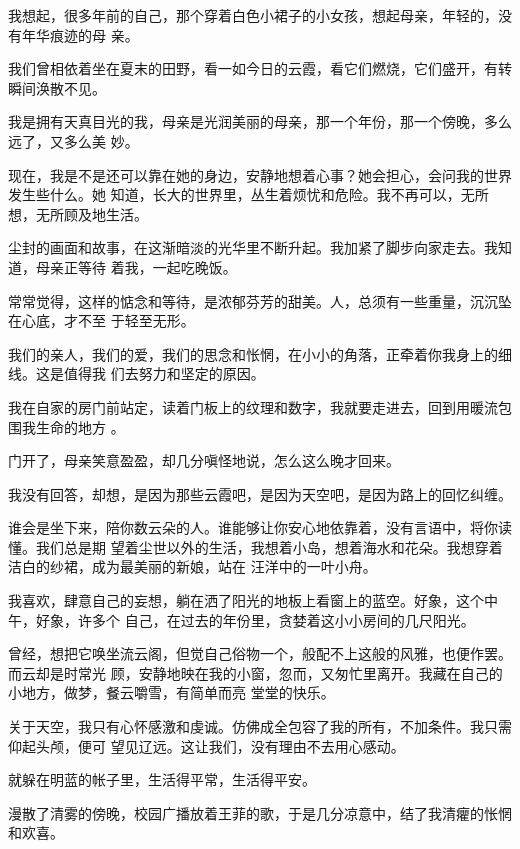 \documentclass[12pt,a4paper]{article}
\begin{document}
		我想起，很多年前的自己，那个穿着白色小裙子的小女孩，想起母亲，年轻的，没有年华痕迹的母
	亲。

		我们曾相依着坐在夏末的田野，看一如今日的云霞，看它们燃烧，它们盛开，有转瞬间涣散不见。

		我是拥有天真目光的我，母亲是光润美丽的母亲，那一个年份，那一个傍晚，多么远了，又多么美
	妙。

		现在，我是不是还可以靠在她的身边，安静地想着心事？她会担心，会问我的世界发生些什么。她
	知道，长大的世界里，丛生着烦忧和危险。我不再可以，无所想，无所顾及地生活。


		尘封的画面和故事，在这渐暗淡的光华里不断升起。我加紧了脚步向家走去。我知道，母亲正等待
	着我，一起吃晚饭。

		常常觉得，这样的惦念和等待，是浓郁芬芳的甜美。人，总须有一些重量，沉沉坠在心底，才不至
	于轻至无形。

		我们的亲人，我们的爱，我们的思念和怅惘，在小小的角落，正牵着你我身上的细线。这是值得我
	们去努力和坚定的原因。

		我在自家的房门前站定，读着门板上的纹理和数字，我就要走进去，回到用暖流包围我生命的地方
	。

		门开了，母亲笑意盈盈，却几分嗔怪地说，怎么这么晚才回来。

		我没有回答，却想，是因为那些云霞吧，是因为天空吧，是因为路上的回忆纠缠。


		谁会是坐下来，陪你数云朵的人。谁能够让你安心地依靠着，没有言语中，将你读懂。我们总是期
	望着尘世以外的生活，我想着小岛，想着海水和花朵。我想穿着洁白的纱裙，成为最美丽的新娘，站在
	汪洋中的一叶小舟。


		我喜欢，肆意自己的妄想，躺在洒了阳光的地板上看窗上的蓝空。好象，这个中午，好象，许多个
	自己，在过去的年份里，贪婪着这小小房间的几尺阳光。

		曾经，想把它唤坐流云阁，但觉自己俗物一个，般配不上这般的风雅，也便作罢。而云却是时常光
	顾，安静地映在我的小窗，忽而，又匆忙里离开。我藏在自己的小地方，做梦，餐云嚼雪，有简单而亮
	堂堂的快乐。


		关于天空，我只有心怀感激和虔诚。仿佛成全包容了我的所有，不加条件。我只需仰起头颅，便可
	望见辽远。这让我们，没有理由不去用心感动。


		就躲在明蓝的帐子里，生活得平常，生活得平安。

	\endwriting



		漫散了清雾的傍晚，校园广播放着王菲的歌，于是几分凉意中，结了我清癯的怅惘和欢喜。
\end{document}
